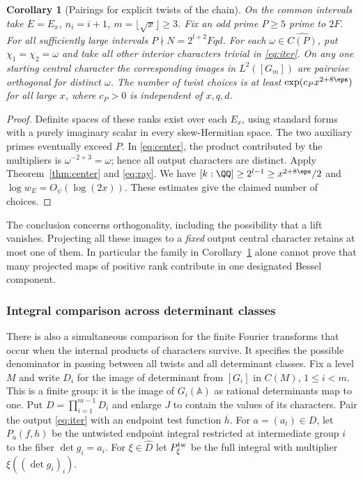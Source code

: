 \documentclass[a4paper,11pt]{article}
\newtheorem{corollary}[proposition]{Corollary}
\theoremstyle{definition}
\theoremstyle{remark}
\numberwithin{equation}{section}
\begin{document}
\begin{corollary}[Pairings for explicit twists of the chain]\label{cor:orth}
On the common intervals take \(E=E_x\), \(n_i=i+1\), \(m=\lfloor\sqrt x\rfloor\ge3\). Fix an odd prime \(P\ge5\) prime to \(2F\). For all sufficiently large intervals \(P\nmid N=2^{l+2}Fqd\). For each \(\omega\in\widehat{C(P)}\), put \(\chi_1=\chi_2=\omega\) and take all other interior characters trivial in \eqref{eq:iter}. On any one starting central character the corresponding images in \(L^2([G_m])\) are pairwise orthogonal for distinct \(\omega\). The number of twist choices is at least \(\exp(c_P x^{2+8\eps})\) for all large \(x\), where \(c_P>0\) is independent of \(x,q,d\).
\end{corollary}
\begin{proof}
Definite spaces of these ranks exist over each \(E_x\), using standard forms with a purely imaginary scalar in every skew-Hermitian space. The two auxiliary primes eventually exceed \(P\). In \eqref{eq:center}, the product contributed by the multipliers is \(\omega^{-2+3}=\omega\); hence all output characters are distinct. Apply Theorem~\ref{thm:center} and \eqref{eq:ray}. We have \([k:\QQ]\ge 2^{l-1}\ge x^{2+8\eps}/2\) and \(\log w_E=O_\psi(\log(2x))\). These estimates give the claimed number of choices.
\end{proof}

The conclusion concerns orthogonality, including the possibility that a lift vanishes. Projecting all these images to a \emph{fixed} output central character retains at most one of them. In particular the family in Corollary~\ref{cor:orth} alone cannot prove that many projected maps of positive rank contribute in one designated Bessel component.

\subsubsection{Integral comparison across determinant classes}\label{nav:I-42}
There is also a simultaneous comparison for the finite Fourier transforms that occur when the internal products of characters survive. It specifies the possible denominator in passing between all twists and all determinant classes. Fix a level \(M\) and write \(D_i\) for the image of determinant from \([G_i]\) in \(C(M)\), \(1\le i<m\). This is a finite group: it is the image of \(G_i(\mathbb A)\) as rational determinants map to one. Put \(D=\prod_{i=1}^{m-1} D_i\) and enlarge \(J\) to contain the values of its characters. Pair the output \eqref{eq:iter} with an endpoint test function \(\overline h\). For \(a=(a_i)\in D\), let \(P_a(f,h)\) be the untwisted endpoint integral restricted at intermediate group \(i\) to the fiber \(\det g_i=a_i\). For \(\xi\in\widehat D\) let \(P_\xi^{\rm tw}\) be the full integral with multiplier \(\xi((\det g_i)_i)\).
\end{document}
